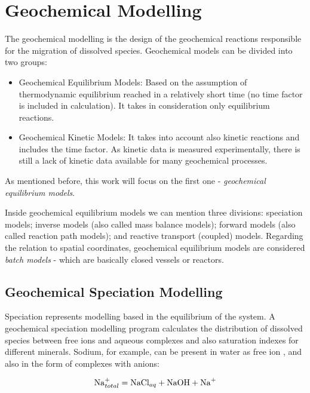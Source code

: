 \documentclass[ppgc,mestrado,english]{iiufrgs}
\begin{document}
\section{Geochemical Modelling}
The geochemical modelling is the design of the geochemical reactions responsible for the migration of dissolved species. Geochemical models can be divided into two groups:
\begin{itemize}
\item Geochemical Equilibrium Models: Based on the assumption of thermodynamic equilibrium reached in a relatively short time (no time factor is included in calculation). It takes in consideration only equilibrium reactions.
\item Geochemical Kinetic Models: It takes into account also kinetic reactions and includes the time factor. As kinetic data is measured experimentally, there is still a lack of kinetic data available for many geochemical processes. 
\end{itemize}

As mentioned before, this work will focus on the first one - \emph{geochemical equilibrium models}.

Inside geochemical equilibrium models we can mention three divisions: speciation models; inverse models (also called mass balance models); forward models (also called reaction path models); and reactive transport (coupled) models. Regarding the relation to spatial coordinates, geochemical equilibrium models are considered \emph{batch models} - which are basically closed vessels or reactors.

\subsection{Geochemical Speciation Modelling}
Speciation represents modelling based in the equilibrium of the system. A geochemical speciation modelling program calculates the distribution of dissolved species between free ions and aqueous complexes and also saturation indexes for different minerals. Sodium, for example, can be present in water as free ion , and also in the form of complexes with anions:

\begin{equation}
\ce{Na^+}_{total} = \ce{NaCl}_{aq} + \ce{NaOH} + \ce{Na^+}
\end{equation}
\end{document}
